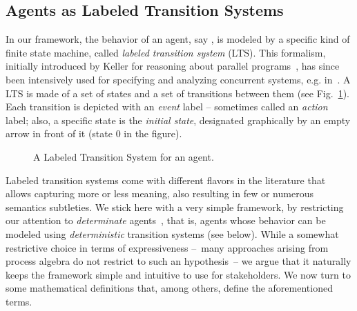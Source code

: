 \subsection{Agents as Labeled Transition Systems}

In our framework, the behavior of an agent, say , is modeled by a specific kind of finite state machine, called \emph{labeled transition system} (LTS). This formalism, initially introduced by Keller for reasoning about parallel programs~\cite{Keller:1976}, has since been intensively used for specifying and analyzing concurrent systems, e.g. in~\cite{Milner:1989, Clarke:1989, Magee:1997}. A LTS is made of a set of states and a set of transitions between them (see Fig.~\ref{image:framework-start-stop}). Each transition is depicted with an \emph{event} label -- sometimes called an \emph{action} label; also, a specific state is the \emph{initial state}, designated graphically by an empty arrow in front of it (state 0 in the figure). 

\vspace{0.5cm}
\begin{figure}[H]
\centering{}
  \caption{A Labeled Transition System for an  agent\label{image:framework-start-stop}.}
\end{figure}

Labeled transition systems come with different flavors in the literature that allows capturing more or less meaning, also resulting in few or numerous semantics subtleties. We stick here with a very simple framework, by restricting our attention to \emph{determinate} agents~\cite{Engelfriet:1985}, that is, agents whose behavior can be modeled using \emph{deterministic} transition systems (see below). While a somewhat restrictive choice in terms of expressiveness --~many approaches arising from process algebra do not restrict to such an hypothesis~-- we argue that it naturally keeps the framework simple and intuitive to use for stakeholders. We now turn to some mathematical definitions that, among others, define the aforementioned terms.


